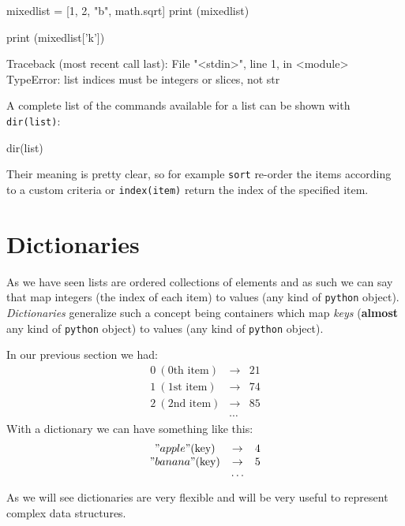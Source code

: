 \begin{ipython}
mixedlist = [1, 2, "b", math.sqrt]
print (mixedlist)
\end{ipython}
\begin{ioutput}
\end{ioutput}

\begin{ipython}
print (mixedlist['k'])
\end{ipython}
\begin{ioutput}
Traceback (most recent call last):
  File "<stdin>", line 1, in <module>
TypeError: list indices must be integers or slices, not str
\end{ioutput}

A complete list of the commands available for a list can be shown with \texttt{dir(list)}:

\begin{ipython}
dir(list)
\end{ipython}
\begin{ioutput}
\end{ioutput}

Their meaning is pretty clear, so for example \texttt{sort} re-order the items according to a custom criteria or \texttt{index(item)} return the index of the specified item.

\section{Dictionaries}\label{dictionaries}

As we have seen lists are ordered collections of elements and as such we can say that map integers (the index of each item) to values (any kind of \texttt{python} object). \emph{Dictionaries} generalize such a concept being containers which map \emph{keys} (\textbf{almost} any kind of \texttt{python} object) to values (any kind of \texttt{python} object).

In our previous section we had:
\[
\begin{matrix} 
0~(\textrm{0th item})& \rightarrow& 21\\
1~(\textrm{1st item})& \rightarrow& 74\\
2~(\textrm{2nd item})& \rightarrow& 85\\ 
&\cdots&  
\end{matrix}
\]
With a dictionary we can have something like this:
\[
\begin{matrix}
"apple" (\textrm{key})&\rightarrow& 4 \\
"banana" (\textrm{key})& \rightarrow& 5 \\
&\cdots&
\end{matrix}
\]
As we will see dictionaries are very flexible and will be very useful to represent complex data structures.

